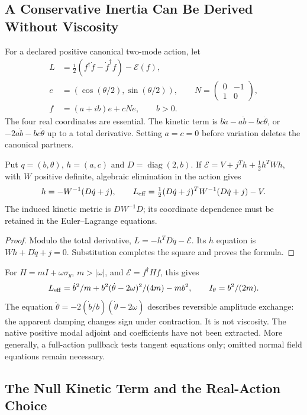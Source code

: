 \subsection{A Conservative Inertia Can Be Derived Without Viscosity}

For a declared positive canonical two-mode action, let
\begin{align*}
 L&=\frac i2(f^\dagger\dot f-\dot f^\dagger f)-\mathcal E(f),\\
 e&=(\cos(\theta/2),\sin(\theta/2)),\qquad
 N=\begin{pmatrix}0&-1\\1&0\end{pmatrix},\\
 f&=(a+ib)e+cNe,\qquad b>0.
\end{align*}
The four real coordinates are essential. The kinetic term is
$b\dot a-a\dot b-bc\dot\theta$, or
$-2a\dot b-bc\dot\theta$ up to a total derivative.
Setting $a=c=0$ before variation deletes the canonical partners.

\begin{proposition}
\label{v480:hc-collective-inertia}
Put $q=(b,\theta)$, $h=(a,c)$ and $D=\operatorname{diag}(2,b)$.
If $\mathcal E=V+j^Th+\tfrac12h^TWh$, with $W$ positive
definite, algebraic elimination in the action gives
\[
 h=-W^{-1}(D\dot q+j),\qquad
 L_{\rm eff}=\tfrac12(D\dot q+j)^TW^{-1}(D\dot q+j)-V.
\]
The induced kinetic metric is $DW^{-1}D$; its coordinate dependence
must be retained in the Euler--Lagrange equations.
\end{proposition}
\begin{proof}
Modulo the total derivative, $L=-h^TD\dot q-\mathcal E$.
Its $h$ equation is $Wh+D\dot q+j=0$. Substitution completes
the square and proves the formula.
\end{proof}

For $H=mI+\omega\sigma_y$, $m>|\omega|$, and
$\mathcal E=f^\dagger Hf$, this gives
\[
 L_{\rm eff}=\dot b^2/m+
      b^2(\dot\theta-2\omega)^2/(4m)-mb^2,
 \qquad I_\theta=b^2/(2m).
\]
The equation $\ddot\theta=-2(\dot b/b)(\dot\theta-2\omega)$
describes reversible amplitude exchange: the apparent damping changes
sign under contraction. It is not viscosity. The native positive
modal adjoint and coefficients have not been extracted. More generally,
a full-action pullback tests tangent equations only; omitted normal
field equations remain necessary.

\subsection{The Null Kinetic Term and the Real-Action Choice}

